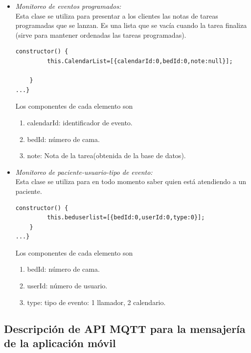 \begin{itemize}
\item \textit{ Monitoreo de eventos programados:}\\
Esta clase se utiliza para presentar a los clientes las notas de tareas programadas que se lanzan. Es una lista que se vacía cuando la tarea finaliza (sirve para mantener ordenadas las tareas programadas).

\begin{lstlisting}[caption=  Clase CalendarList]
constructor() {
         this.CalendarList=[{calendarId:0,bedId:0,note:null}];                
        
    }
...}
\end{lstlisting}

Los componentes de cada elemento son 
	\begin{enumerate}
		\item calendarId: identificador de evento.
		\item bedId: número de cama.
		\item note: Nota de la tarea(obtenida de la base de datos).		

	\end{enumerate}




\item \textit{ Monitoreo de paciente-usuario-tipo de evento:}\\
Esta clase se utiliza para en todo momento saber quien está atendiendo a un paciente.

\begin{lstlisting}[caption=  Clase BedsUserList]
 constructor() {
         this.beduserlist=[{bedId:0,userId:0,type:0}];                        
    }
...}
\end{lstlisting}

Los componentes de cada elemento son 
	\begin{enumerate}
		\item bedId: número de cama.
		\item userId: número de usuario.
		\item type: tipo de evento: 1 llamador, 2 calendario.		

	\end{enumerate}


\end{itemize}
\subsection{Descripción de API MQTT para la mensajería de la aplicación móvil}

